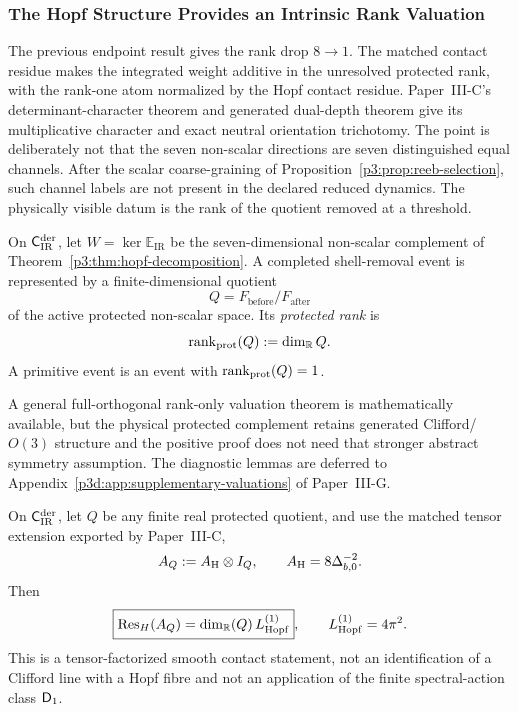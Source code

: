 \documentclass[12pt,a4paper]{article}
\begin{document}
\subsubsection{The Hopf Structure Provides an Intrinsic Rank Valuation}
\label{p3:sec:hopf-rank-valuation}

The previous endpoint result gives the rank drop \(8\to 1\).  The matched
contact residue makes the integrated weight additive in the unresolved
protected rank, with the rank-one atom normalized by the Hopf contact residue.
Paper~III-C's determinant-character theorem and generated dual-depth theorem
give its multiplicative character and exact neutral orientation trichotomy.
The point is
deliberately not that the seven non-scalar directions
are seven distinguished equal channels.  After the scalar coarse-graining of
Proposition~\ref{p3:prop:reeb-selection}, such channel labels are not present in the declared
reduced dynamics.  The physically visible datum is the rank of the quotient removed at a threshold.

\begin{definition}
\label{p3:def:protected-rank-quotient}
On \(\mathsf C_{\rm IR}^{\rm der}\), let
\(W=\ker\mathbb E_{\mathrm{IR}}\) be the seven-dimensional non-scalar
complement of Theorem~\ref{p3:thm:hopf-decomposition}.  A completed
shell-removal event is represented by a
finite-dimensional quotient
\[
Q=F_{\mathrm{before}}/F_{\mathrm{after}}
\]
of the active protected non-scalar space.  Its \emph{protected rank} is
\[
\operatorname{rank}_{\mathrm{prot}}(Q):=\dim_{\mathbb{R}}Q.
\]
A primitive event is an event with \(\operatorname{rank}_{\mathrm{prot}}(Q)=1\).
\end{definition}

\begin{remark}
A general full-orthogonal rank-only valuation theorem is mathematically
available, but the physical protected complement retains generated
Clifford/\(O(3)\) structure and the positive proof does not need that stronger
abstract symmetry assumption.  The diagnostic lemmas are deferred to
Appendix~\ref{p3d:app:supplementary-valuations} of Paper~III-G.
\end{remark}

\begin{lemma}
\label{p3:lem:rank-atom-hopf-trace-localization}
On \(\mathsf C_{\rm IR}^{\rm der}\), let
\(Q\) be any finite real protected quotient, and use the matched tensor
extension exported by Paper~III-C,
\[
 A_Q:=A_{\rm H}\otimes I_Q,
 \qquad A_{\rm H}=8\Delta_{b,0}^{-2}.
\]
Then
\[
 \boxed{\operatorname{Res}_{H}(A_Q)
 =\dim_{\mathbb R}(Q)\,L_{\mathrm{Hopf}}^{(1)}},
 \qquad L_{\mathrm{Hopf}}^{(1)}=4\pi^2.
\]
This is a tensor-factorized smooth contact statement, not an identification of
a Clifford line with a Hopf fibre and not an application of the finite
spectral-action class \(\mathsf{D}_1\).
\end{lemma}
\end{document}
